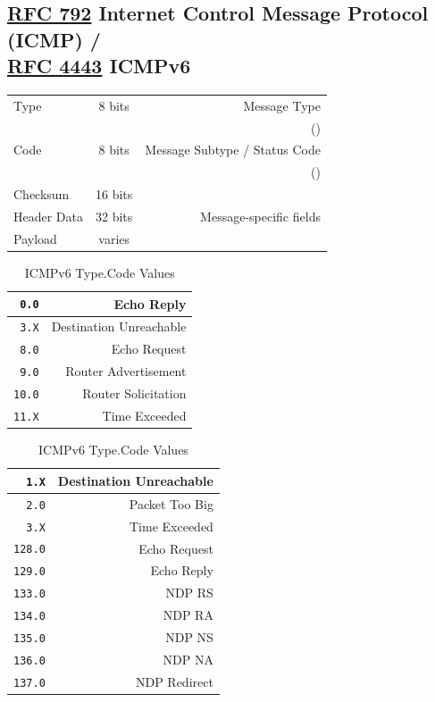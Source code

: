 \documentclass[12pt]{article}
\newcommand{\RFC}[1]{\href{https://datatracker.ietf.org/doc/html/rfc#1}{RFC #1}}
\begin{document}
	\subsection[RFC 792 ICMP / RFC 4443 ICMPv6]{\RFC{792} Internet Control Message Protocol (ICMP) /\\\RFC{4443} ICMPv6 \label{subsec:ICMP}}
	\begin{table}[H]
	\centering
	\begin{tabular}{| l | c | r |}\hline
	Type			& 8 bits	& Message Type\\
				&		& (\Cref{tab:ICMP VALUES,tab:ICMPV6 VALUES}) \\\hline
	Code			& 8 bits	& Message Subtype / Status Code\\
				&		& (\Cref{tab:ICMP VALUES,tab:ICMPV6 VALUES})\\\hline
	Checksum		& 16 bits	&\\\hline
	Header Data	& 32 bits	& Message-specific fields\\\hline
	Payload		& varies	&\\\hline
	\end{tabular}\end{table}

	\begin{table}[H]
	\begin{minipage}[t]{.45\linewidth}
	\centering
	\caption{ICMP Type.Code Values \label{tab:ICMP VALUES}}
	\begin{tabular}{| r | r |}\hline
	\texttt{0.0}	& Echo Reply\\\hline
	\texttt{3.X} 	& Destination Unreachable\\\hline
	\texttt{8.0}	& Echo Request\\\hline
	\texttt{9.0}	& Router Advertisement\\
	\texttt{10.0}	& Router Solicitation\\\hline
	\texttt{11.X} & Time Exceeded\\\hline
	\end{tabular}\end{minipage}\hfill
	\begin{minipage}[t]{.45\linewidth}
	\centering
	\caption{ICMPv6 Type.Code Values\label{tab:ICMPV6 VALUES}}
	\begin{tabular}{| r | r |}\hline
	\texttt{1.X}	 	& Destination Unreachable\\\hline
	\texttt{2.0}		& Packet Too Big\\\hline
	\texttt{3.X}	 	& Time Exceeded\\\hline
	\texttt{128.0}	& Echo Request\\
	\texttt{129.0}	& Echo Reply\\\hline
	\texttt{133.0}	& NDP RS\\
	\texttt{134.0}	& NDP RA\\
	\texttt{135.0}	& NDP NS\\
	\texttt{136.0}	& NDP NA\\
	\texttt{137.0}	& NDP Redirect\\\hline
	\end{tabular}\end{minipage}\end{table}
\end{document}
